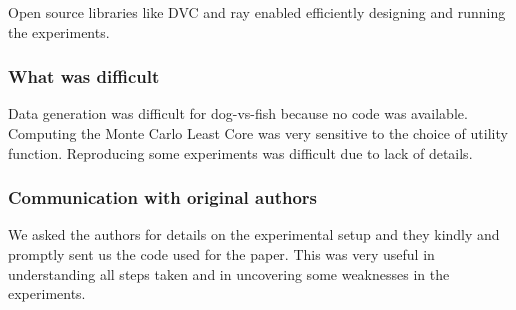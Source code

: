 Open source libraries like DVC and ray enabled efficiently designing and running the experiments.

\subsubsection*{What was difficult}

Data generation was difficult for dog-vs-fish because no code was available. Computing the Monte Carlo Least Core was very sensitive to the choice of utility function. Reproducing some experiments was difficult due to lack of details.

\subsubsection*{Communication with original authors}

We asked the authors for details on the experimental setup and they kindly and promptly sent us the code used for the paper. This was very useful in understanding all steps taken and in uncovering some weaknesses in the experiments.